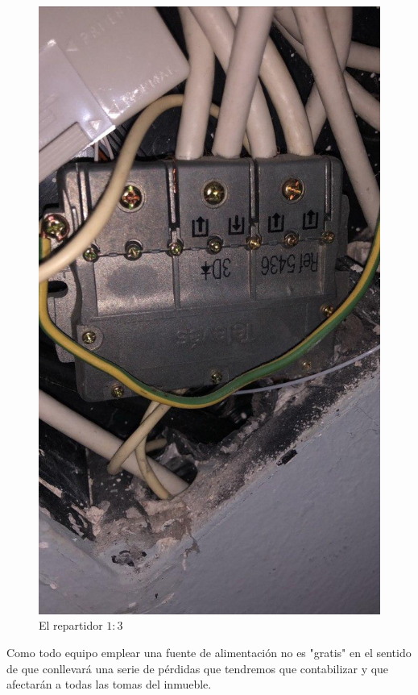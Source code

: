 \documentclass{article}[12 pt]
\begin{document}
			\begin{figure}
				\centering
				\includegraphics[scale=0.2, angle=-90]{repartidor.jpg}
				\caption{El repartidor $1:3$}
				\label{f:pau}
			\end{figure}

			Como todo equipo emplear una fuente de alimentación no es "gratis" en el sentido de que conllevará una serie de pérdidas que tendremos que contabilizar y que afectarán a todas las tomas del inmueble.\\
\end{document}
